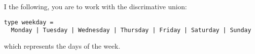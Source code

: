 I the following, you are to work with the discrimative union:
\begin{lstlisting}
type weekday =
  Monday | Tuesday | Wednesday | Thursday | Friday | Saturday | Sunday
\end{lstlisting}
which represents the days of the week.
